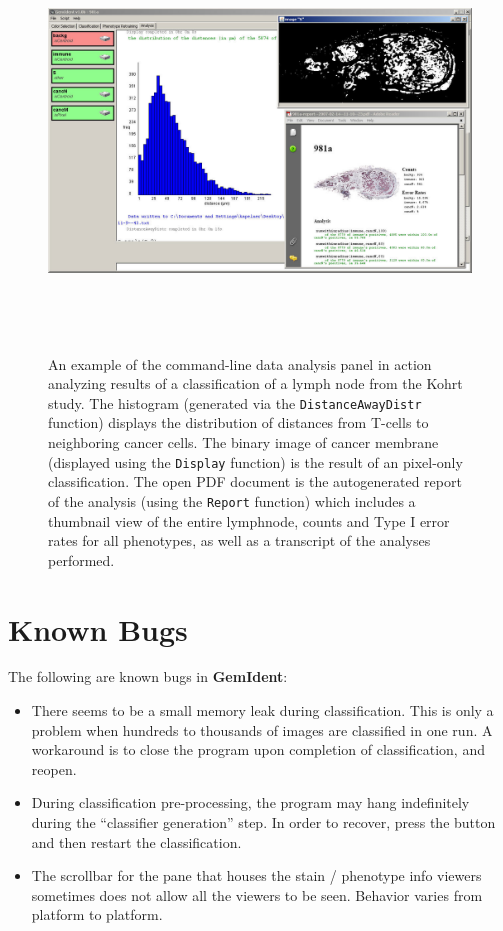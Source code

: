 \documentclass[12pt]{article}
\begin{document}
\begin{figure}[htp]
\centering
\includegraphics[width=7in, height=4.375in]{analysisdata.jpg}
\caption{\sf An example of the command-line data analysis panel in action analyzing results of a classification of a lymph node from the Kohrt study\cite{kohrt}. The histogram (generated via the {\tt DistanceAwayDistr} function) displays the distribution of distances from T-cells to neighboring cancer cells. The binary image of cancer membrane (displayed using the {\tt Display} function) is the result of an pixel-only classification. The open PDF document is the autogenerated report of the analysis (using the {\tt Report} function) which includes a thumbnail view of the entire lymphnode, counts and Type I error rates for all phenotypes, as well as a transcript of the analyses performed.}
\label{fig:DataAnalysisInAction}
\end{figure}

\section{Known Bugs}

The following are known bugs in {\bf GemIdent}:

\begin{itemize}
\item There seems to be a small memory leak during classification. This is only a problem when hundreds to thousands of images are classified in one run. A workaround is to close the program upon completion of classification, and reopen.
\item During classification pre-processing, the program may hang indefinitely during the ``classifier generation'' step. In order to recover, press the  button and then restart the classification.
\item The scrollbar for the pane that houses the stain / phenotype info viewers sometimes does not allow all the viewers to be seen. Behavior varies from platform to platform.
\end{itemize}
\end{document}
